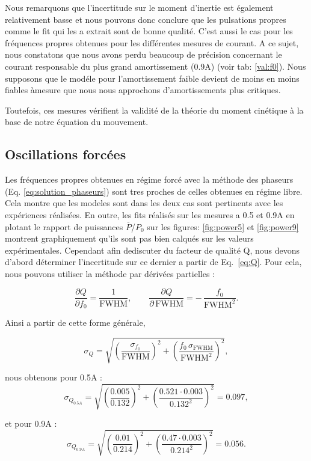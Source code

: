 Nous remarquons que l'incertitude sur le moment d'inertie est également relativement basse et nous pouvons donc conclure que les pulsations propres comme le fit qui les a extrait sont de bonne qualité. C'est aussi le cas pour les fréquences propres obtenues pour les différentes mesures de courant. A ce sujet, nous constatons que nous avons perdu beaucoup de précision concernant le courant responsable du plus grand amortissement (0.9A) (voir tab: \ref{val:f0}). Nous supposons que le modéle pour l'amortissement faible devient de moins en moins fiables  àmesure que nous nous approchons d'amortissements plus critiques.  

Toutefois, ces mesures vérifient la validité de la théorie du moment cinétique à la base de notre équation du mouvement.

\subsection{Oscillations forcées}

Les fréquences propres obtenues en régime forcé avec la méthode des phaseurs (Eq. \ref{eq:solution_phaseurs}) sont tres proches de celles obtenues en régime libre. Cela montre que les modeles sont dans les deux cas sont pertinents avec les expériences réalisées. 
En outre, les fits réalisés sur les mesures a 0.5 et 0.9A en plotant le rapport de puissances $\overline{P}$/$P_0$ sur les figures: \ref{fig:power5} et \ref{fig:power9} montrent graphiquement qu'ils sont pas bien calqués sur les valeurs expérimentales. Cependant afin dediscuter du facteur de qualité Q, nous devons d'abord déterminer l'incertitude sur ce dernier a partir de Eq.~\ref{eq:Q}. Pour cela, nous pouvons utiliser la méthode par dérivées partielles :

\[
\frac{\partial Q}{\partial f_0} = \frac{1}{\mathrm{FWHM}},
\qquad
\frac{\partial Q}{\partial\,\mathrm{FWHM}}
= -\,\frac{f_0}{\mathrm{FWHM}^2}.
\]

Ainsi a partir de cette forme générale,

\[
\sigma_Q
=
\sqrt{
\left(\frac{\sigma_{f_0}}{\mathrm{FWHM}}\right)^2
+
\left(
\frac{f_0\,\sigma_{\mathrm{FWHM}}}{\mathrm{FWHM}^2}
\right)^2
},
\]

nous obtenons pour 0.5A :
\[
\sigma_{Q_{0.5A}}
=
\sqrt{
\left(\frac{0.005}{0.132}\right)^2
+
\left(\frac{0.521 \cdot 0.003}{0.132^2}\right)^2
}
= 0.097,
\]

et pour 0.9A :
\[
\sigma_{Q_{0.9A}}
=
\sqrt{
\left(\frac{0.01}{0.214}\right)^2
+
\left(\frac{0.47 \cdot 0.003}{0.214^2}\right)^2
}
= 0.056.
\]

